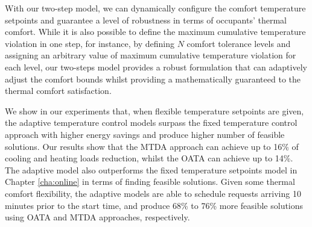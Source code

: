 %

With our two-step model, we can dynamically configure the comfort temperature setpoints and guarantee a level of robustness in terms of occupants' thermal comfort. 
While it is also possible to define the maximum cumulative temperature violation in one step, for instance, by defining $N$ comfort tolerance levels and assigning an arbitrary value of maximum cumulative temperature violation for each level, our two-steps model provides a robust formulation that can adaptively adjust the comfort bounds whilst providing a mathematically guaranteed to the thermal comfort satisfaction.




We show in our experiments that, when flexible temperature setpoints are given, the adaptive temperature control models surpass the fixed temperature control approach with higher energy savings and produce higher number of feasible solutions.
Our results show that the MTDA approach can achieve up to 16\% of cooling and heating loads reduction, whilst the OATA can achieve up to 14\%. The adaptive model also outperforms the fixed temperature setpoints model in Chapter \ref{cha:online} in terms of finding feasible solutions. Given some thermal comfort flexibility, the adaptive models are able to schedule requests arriving 10 minutes prior to the start time, and produce 68\% to 76\% more feasible solutions using OATA and MTDA approaches, respectively.


